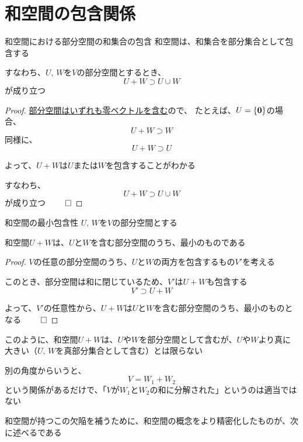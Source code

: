 \documentclass[../../../topic_linear-algebra]{subfiles}
\begin{document}
\sectionline
\section{和空間の包含関係}

\begin{theorem*}{和空間における部分空間の和集合の包含}
  和空間は、和集合を部分集合として包含する

  すなわち、$U,\,W$を$V$の部分空間とするとき、
  \begin{equation*}
    U + W \supset U \cup W
  \end{equation*}
  が成り立つ
\end{theorem*}

\begin{proof}
  \hyperref[thm:subspace-contains-zero]{部分空間はいずれも零ベクトルを含む}ので、
  たとえば、$U = \{ \vb*{0} \}$の場合、
  \begin{equation*}
    U + W \supset W
  \end{equation*}
  同様に、
  \begin{equation*}
    U + W \supset U
  \end{equation*}

  よって、$U+W$は$U$または$W$を包含することがわかる

  すなわち、
  \begin{equation*}
    U + W \supset U \cup W
  \end{equation*}
  が成り立つ $\qed$
\end{proof}

\sectionline

\begin{theorem*}{和空間の最小包含性}
  $U,\,W$を$V$の部分空間とする

  和空間$U+W$は、$U$と$W$を含む部分空間のうち、最小のものである
\end{theorem*}

\begin{proof}
  $V$の任意の部分空間のうち、$U$と$W$の両方を包含するもの$V'$を考える

  このとき、部分空間は和に閉じているため、$V'$は$U+W$も包含する
  \begin{equation*}
    V' \supset U + W
  \end{equation*}

  よって、$V'$の任意性から、$U + W$は$U$と$W$を含む部分空間のうち、最小のものとなる $\qed$
\end{proof}

\sectionline

このように、和空間$U+W$は、$U$や$W$を部分空間として含むが、$U$や$W$より真に大きい（$U,\,W$を真部分集合として含む）とは限らない

\br

別の角度からいうと、
\begin{equation*}
  V = W_1 + W_2
\end{equation*}
という関係があるだけで、「$V$が$W_1$と$W_2$の和に分解された」というのは適当ではない

\br

和空間が持つこの欠陥を補うために、和空間の概念をより精密化したものが、次に述べるである
\end{document}
